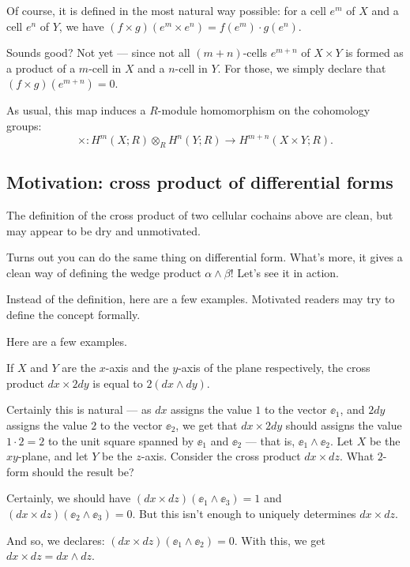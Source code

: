 Of course, it is defined in the most natural way possible: for a cell $e^m$ of $X$ and a cell $e^n$
of $Y$, we have $(f \times g)(e^m \times e^n) = f(e^m) \cdot g(e^n)$.

Sounds good? Not yet --- since not all $(m + n)$-cells $e^{m + n}$ of $X \times Y$
is formed as a product of a $m$-cell in $X$ and a $n$-cell in $Y$.
For those, we simply declare that $(f \times g)(e^{m + n}) = 0$.

As usual, this map induces a $R$-module homomorphism on the cohomology groups:
\[ \times \colon H^m(X; R) \otimes_R H^n(Y; R) \to H^{m + n}(X \times Y; R). \]

\subsection{Motivation: cross product of differential forms}

The definition of the cross product of two cellular cochains above are clean, but may appear to be
dry and unmotivated.

Turns out you can do the same thing on differential form.
What's more, it gives a clean way of defining the wedge product $\alpha \wedge \beta$!
Let's see it in action.

Instead of the definition, here are a few examples. Motivated readers may try to define the concept
formally.
\begin{example}
	Here are a few examples.
	\begin{itemize}
		\ii If $X$ and $Y$ are the $x$-axis and the $y$-axis of the plane respectively,
		the cross product $dx \times 2dy$ is equal to $2(dx \wedge dy)$.

		Certainly this is natural --- as $dx$ assigns the value $1$ to the vector $\ee_1$,
		and $2dy$ assigns the value $2$ to the vector $\ee_2$, we get that $dx \times 2dy$ should
		assigns the value $1 \cdot 2 = 2$ to the unit square spanned by $\ee_1$ and $\ee_2$ --- that
		is, $\ee_1 \wedge \ee_2$.
		\ii Let $X$ be the $xy$-plane, and let $Y$ be the $z$-axis.
		Consider the cross product $dx \times dz$. What $2$-form should the result be?

		Certainly, we should have $(dx \times dz)(\ee_1 \wedge \ee_3) = 1$
		and $(dx \times dz)(\ee_2 \wedge \ee_3) = 0$.
		But this isn't enough to uniquely determines $dx \times dz$.

		And so, we declares: $(dx \times dz)(\ee_1 \wedge \ee_2) = 0$.
		With this, we get $dx \times dz = dx \wedge dz$.
	\end{itemize}
\end{example}

